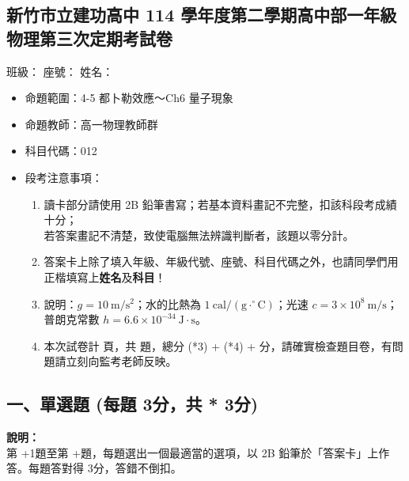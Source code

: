 \documentclass[10pt,a4paper]{article}
\newcommand{\scscore}{3}
\newcommand{\mcscore}{4}
\newcommand{\examheader}{
    \begin{center}
        \section*{新竹市立建功高中 114 學年度第二學期高中部一年級物理第三次定期考試卷}
    \end{center}
}
\begin{document}
\examheader

\noindent \hspace*{\fill} \large 班級：\underline{\hspace{1.5cm}} 座號：\underline{\hspace{1cm}} 姓名：\underline{\hspace{2.5cm}}

\vspace{1em}

\begin{itemize}[leftmargin=1em]
    \item[$\ast$] 命題範圍：4-5 都卜勒效應～Ch6 量子現象
    \item[$\ast$] 命題教師：高一物理教師群
    \item[$\ast$] 科目代碼：012
    \item[$\ast$] 段考注意事項：
    \begin{enumerate}[label=\arabic*., leftmargin=2em]
        \item 讀卡部分請使用 2B 鉛筆書寫；若基本資料畫記不完整，扣該科段考成績十分；\\若答案畫記不清楚，致使電腦無法辨識判斷者，該題以零分計。
        \item 答案卡上除了填入年級、年級代號、座號、科目代碼之外，也請同學們用正楷填寫上\textbf{姓名}及\textbf{科目}！
        \item 說明：$g=10\ \mathrm{m}/\mathrm{s}^2$；水的比熱為 $1\ \mathrm{cal}/(\mathrm{g}\cdot^\circ\mathrm{C})$；光速 $c=3\times 10^8\ \mathrm{m}/\mathrm{s}$；普朗克常數 $h=6.6\times 10^{-34}\ \mathrm{J}\cdot\mathrm{s}$。
        \item 本次試卷計 \pageref{EndOfExam} 頁，共  題，總分 \the\numexpr (*\scscore) + (*\mcscore) +  \relax 分，請確實檢查題目卷，有問題請立刻向監考老師反映。
    \end{enumerate}
\end{itemize}

\subsection*{一、單選題 (每題 \scscore 分，共 \the\numexpr {} * \scscore \relax 分)}
\begin{center}
    \begin{tcolorbox}[colframe=black, colback=white, halign=left, width=\textwidth, arc=2mm]
        \small \textbf{說明：} \\
        第 \the\numexpr\value{qcount}+1\relax 題至第 \the\numexpr\value{qcount}+\relax 題，每題選出一個最適當的選項，以 2B 鉛筆於「答案卡」上作答。每題答對得 \scscore 分，答錯不倒扣。 \\
    \end{tcolorbox}
\end{center}
\end{document}
